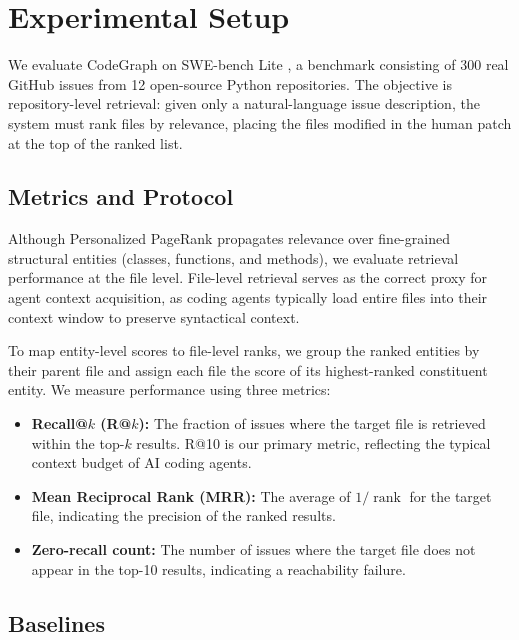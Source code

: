 \section{Experimental Setup}
\label{sec:experimental_setup}

We evaluate CodeGraph on SWE-bench Lite \cite{yang2024swebench}, a benchmark consisting of 300 real GitHub issues from 12 open-source Python repositories. The objective is repository-level retrieval: given only a natural-language issue description, the system must rank files by relevance, placing the files modified in the human patch at the top of the ranked list.

\subsection{Metrics and Protocol}

Although Personalized PageRank propagates relevance over fine-grained structural entities (classes, functions, and methods), we evaluate retrieval performance at the file level. File-level retrieval serves as the correct proxy for agent context acquisition, as coding agents typically load entire files into their context window to preserve syntactical context.

To map entity-level scores to file-level ranks, we group the ranked entities by their parent file and assign each file the score of its highest-ranked constituent entity. We measure performance using three metrics:
\begin{itemize}
    \item \textbf{Recall@$k$ (R@$k$):} The fraction of issues where the target file is retrieved within the top-$k$ results. R@10 is our primary metric, reflecting the typical context budget of AI coding agents.
    \item \textbf{Mean Reciprocal Rank (MRR):} The average of $1 / \operatorname{rank}$ for the target file, indicating the precision of the ranked results.
    \item \textbf{Zero-recall count:} The number of issues where the target file does not appear in the top-10 results, indicating a reachability failure.
\end{itemize}

\subsection{Baselines}

